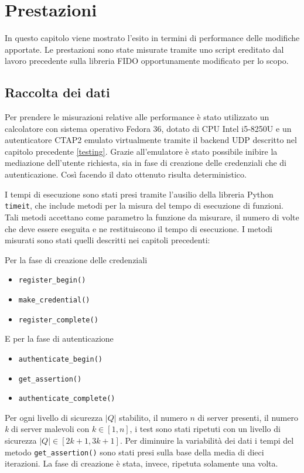 \chapter{Prestazioni}
\label{prestazioni}

In questo capitolo viene mostrato l'esito in termini di performance delle modifiche apportate. Le prestazioni sono state misurate tramite uno script ereditato dal lavoro precedente sulla libreria FIDO opportunamente modificato per lo scopo. 

\section{Raccolta dei dati}
\label{raccolta_dati}

Per prendere le misurazioni relative alle performance è stato utilizzato un calcolatore con sistema operativo Fedora 36, dotato di CPU Intel i5-8250U e un autenticatore CTAP2 emulato virtualmente tramite il backend UDP descritto nel capitolo precedente \ref{testing}. Grazie all'emulatore è stato possibile inibire la mediazione dell'utente richiesta, sia in fase di creazione delle credenziali che di autenticazione. Così facendo il dato ottenuto risulta deterministico.

I tempi di esecuzione sono stati presi tramite l'ausilio della libreria Python \verb*|timeit|, che include metodi per la misura del tempo di esecuzione di funzioni. Tali metodi accettano come parametro la funzione da misurare, il numero di volte che deve essere eseguita e ne restituiscono il tempo di esecuzione. I metodi misurati sono stati quelli descritti nei capitoli precedenti:

Per la fase di creazione delle credenziali
\begin{itemize}
	\item \verb*|register_begin()|
	\item \verb*|make_credential()|
	\item \verb*|register_complete()|
\end{itemize}
E per la fase di autenticazione
\begin{itemize}
	\item \verb*|authenticate_begin()|
	\item \verb*|get_assertion()|
	\item \verb*|authenticate_complete()|
\end{itemize}

Per ogni livello di sicurezza $|Q|$ stabilito, il numero $n$ di server presenti,  il numero \emph{k} di server malevoli con $k \in [1,n]$, i test sono stati ripetuti con un livello di sicurezza $|Q| \in [2k+1, 3k+1]$. Per diminuire la variabilità dei dati i tempi del metodo \verb*|get_assertion()| sono stati presi sulla base della media di dieci iterazioni. La fase di creazione è stata, invece, ripetuta solamente una volta.

